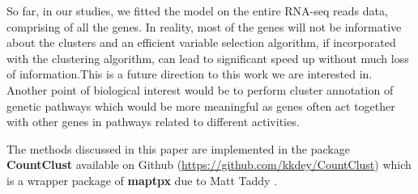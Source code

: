 So far, in our studies, we fitted the model on the entire RNA-seq reads data, comprising of all the genes. In reality, most of the genes will not be informative about the clusters and an efficient variable selection algorithm, if incorporated with the clustering algorithm, can lead to significant speed up without much loss of information.This is a future direction to this work we are interested in. Another point of biological interest would be to perform cluster annotation of genetic pathways which would be more meaningful as genes often act together with other genes in pathways related to different activities. 

The methods discussed in this paper are implemented in the package  \textbf{CountClust} available on Github (\href{https://github.com/kkdey/CountClust}{https://github.com/kkdey/CountClust}) which is a wrapper package of \textbf{maptpx} due to Matt Taddy \cite{Taddy2012}. 

%


